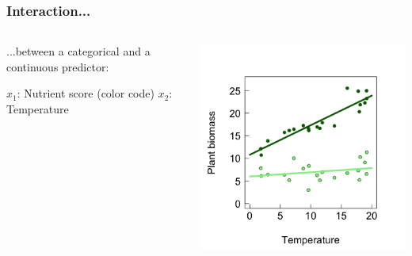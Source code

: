 \documentclass{beamer}
\begin{document}
\begin{frame}
  \frametitle{Interaction...}
  \begin{columns}
      \begin{column}{0.5\textwidth}
          ...between a categorical and a continuous predictor:
      \vspace{0.5cm}

          $x_1$: Nutrient score (color code)
          $x_2$: Temperature
      \end{column}
      \begin{column}{0.5\textwidth}
      \includegraphics[width=\textwidth]{lectures/day_3_LM_refresh_II/figures/unnamed-chunk-37-1.png}
      \end{column}
  \end{columns}
\end{frame}
\end{document}
